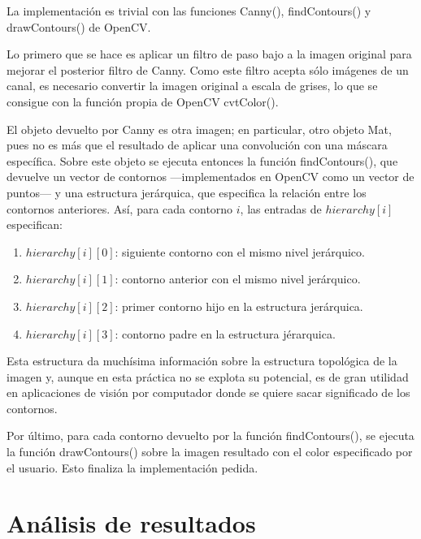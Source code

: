 \documentclass[a4paper, 11pt]{article}
\theoremstyle{definition}
\theoremstyle{theorem}
\begin{document}
  La implementación es trivial con las funciones Canny(), findContours() y drawContours() de OpenCV.

  Lo primero que se hace es aplicar un filtro de paso bajo a la imagen original para mejorar el posterior filtro de Canny. Como este filtro acepta sólo imágenes de un canal, es necesario convertir la imagen original a escala de grises, lo que se consigue con la función propia de OpenCV cvtColor().

  El objeto devuelto por Canny es otra imagen; en particular, otro objeto Mat, pues no es más que el resultado de aplicar una convolución con una máscara específica. Sobre este objeto se ejecuta entonces la función findContours(), que devuelve un vector de contornos ---implementados en OpenCV como un vector de puntos--- y una estructura jerárquica, que especifica la relación entre los contornos anteriores. Así, para cada contorno $i$, las entradas de $hierarchy[i]$ especifican:
  \begin{enumerate}
      \item $hierarchy[i][0]$: siguiente contorno con el mismo nivel jerárquico.
      \item $hierarchy[i][1]$: contorno anterior con el mismo nivel jerárquico.
      \item $hierarchy[i][2]$: primer contorno hijo en la estructura jerárquica.
      \item $hierarchy[i][3]$: contorno padre en la estructura jérarquica.
  \end{enumerate}

  Esta estructura da muchísima información sobre la estructura topológica de la imagen y, aunque en esta práctica no se explota su potencial, es de gran utilidad en aplicaciones de visión por computador donde se quiere sacar significado de los contornos.

  Por último, para cada contorno devuelto por la función findContours(), se ejecuta la función drawContours() sobre la imagen resultado con el color especificado por el usuario. Esto finaliza la implementación pedida.

  \newpage
  \section{Análisis de resultados}
\end{document}
